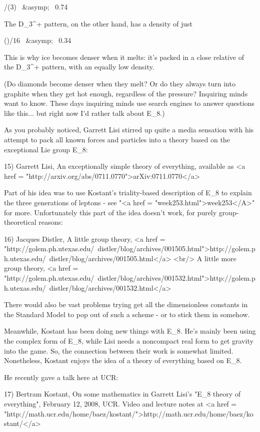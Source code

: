 \pi  /(3) \  &asymp; \  0.74

The D_{3}^{+} pattern, on the other hand, has a
density of just

(\pi {})/16 \  &asymp; \  0.34  

This is why ice becomes denser when it melts: it's packed in 
a close relative of the D_{3}^{+} pattern, with
an equally low density.

(Do diamonds become denser when they melt?  Or do they always turn
into graphite when they get hot enough, regardless of the pressure?
Inquiring minds want to know.  These days inquiring minds use search
engines to answer questions like this... but right now I'd rather talk
about E_{8}.)

As you probably noticed, Garrett Lisi stirred up quite a media 
sensation with his attempt to pack all known forces and particles 
into a theory based on the exceptional Lie group E_{8}:

15) Garrett Lisi, An exceptionally simple theory of everything,
available as <a href = "http://arxiv.org/abs/0711.0770">arXiv:0711.0770</a>

Part of his idea was to use Kostant's triality-based description of
E_{8} to explain the three generations of leptons - see
"<a href = "week253.html">week253</A>" for more.
Unfortunately this part of the idea doesn't work, for purely
group-theoretical reasons:

16) Jacques Distler, A little group theory,
<a href = "http://golem.ph.utexas.edu/~distler/blog/archives/001505.html">http://golem.ph.utexas.edu/~distler/blog/archives/001505.html</a>  <br/>
A little more group theory, 
<a href = "http://golem.ph.utexas.edu/~distler/blog/archives/001532.html">http://golem.ph.utexas.edu/~distler/blog/archives/001532.html</a>

There would also be vast problems trying get all the dimensionless
constants in the Standard Model to pop out of such a scheme - or 
to stick them in somehow.

Meanwhile, Kostant has been doing new things with E_{8}.  He's
mainly been using the complex form of E_{8}, while Lisi needs
a noncompact real form to get gravity into the game. So, the
connection between their work is somewhat limited.  Nonetheless,
Kostant enjoys the idea of a theory of everything based on
E_{8}.

He recently gave a talk here at UCR:

17) Bertram Kostant, On some mathematics in Garrett Lisi's
"E_{8} theory of everything", February 12, 2008,
UCR.  Video and lecture notes at
<a href = "http://math.ucr.edu/home/baez/kostant/">http://math.ucr.edu/home/baez/kostant/</a>

